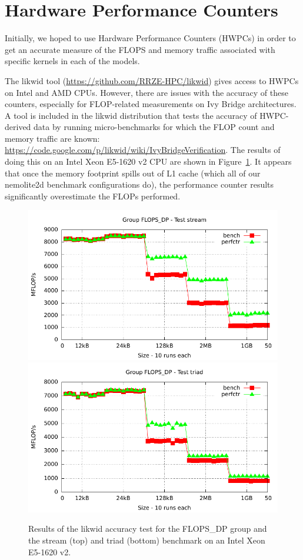 \documentclass[12pt]{article}
\begin{document}
\section{Hardware Performance Counters}

Initially, we hoped to use Hardware Performance Counters (HWPCs) in
order to get an accurate measure of the FLOPS and memory traffic
associated with specific kernels in each of the models.

The likwid tool (\url{https://github.com/RRZE-HPC/likwid}) gives
access to HWPCs on Intel and AMD CPUs.
However, there are issues with the accuracy of these counters,
especially for FLOP-related measurements on Ivy Bridge architectures. A
tool is included in the likwid distribution that tests the accuracy of
HWPC-derived data by running micro-benchmarks for which the FLOP count
and memory traffic are known:
\url{https://code.google.com/p/likwid/wiki/IvyBridgeVerification}.
The results of doing this on an Intel Xeon E5-1620 v2 CPU are shown in
Figure~\ref{FIG_flops_dp_test}. It appears that once the memory
footprint spills out of L1 cache (which all of our nemolite2d
benchmark configurations do), the performance counter results
significantly overestimate the FLOPs performed.

\begin{figure}
\centering
\includegraphics[width=120mm]{FLOPS_DP_stream_ivybridgeEP.pdf}
\includegraphics[width=120mm]{FLOPS_DP_triad_ivybridgeEP.pdf}
\caption{Results of the likwid accuracy test for the FLOPS\_DP group
  and the stream (top) and triad (bottom) benchmark on an Intel Xeon
  E5-1620 v2.}
\label{FIG_flops_dp_test}
\end{figure}
\end{document}
